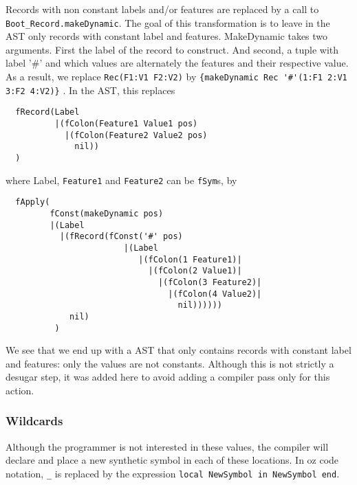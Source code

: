 \documentclass[a4paper]{memoir}
\begin{document}
Records with non constant labels and/or features are replaced by a call to \lstinline!Boot_Record.makeDynamic!. The goal of this transformation is to leave in the AST only records with constant label and features. MakeDynamic takes two arguments. First the label of the record to construct. And second, a tuple with label '\#' and which values are alternately the features and their respective value. As a result, we replace \lstinline!Rec(F1:V1 F2:V2)! by \lstinline!{makeDynamic Rec '#'(1:F1 2:V1 3:F2 4:V2)}! .
In the AST, this replaces 
\begin{lstlisting}
  fRecord(Label 
          |(fColon(Feature1 Value1 pos)
            |(fColon(Feature2 Value2 pos)
              nil))
  )
\end{lstlisting}
where Label, \lstinline!Feature1! and \lstinline!Feature2! can be
\lstinline!fSym!s, by
\begin{lstlisting}
  fApply(
         fConst(makeDynamic pos) 
         |(Label
           |(fRecord(fConst('#' pos) 
                        |(Label
                           |(fColon(1 Feature1)|
                             |(fColon(2 Value1)|
                               |(fColon(3 Feature2)|
                                 |(fColon(4 Value2)|
                                   nil))))))
             nil)
          )
\end{lstlisting}
We see that we end up with a AST that only contains records with constant label and features: only the values are not constants.
Although this is not strictly a desugar step, it was added here to avoid adding a compiler pass only for this action.
\subsubsection{Wildcards}
Although the programmer is not interested in these values, the compiler will declare and place a new synthetic symbol in each of these locations. In oz code notation, \lstinline!_! is replaced by the expression \lstinline!local NewSymbol in NewSymbol end!.
\end{document}
